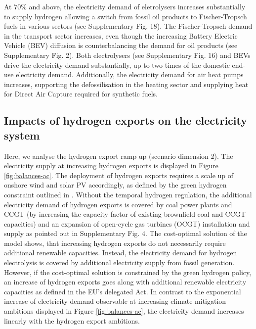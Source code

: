 \documentclass[5p,numafflabel]{elsarticle}
\begin{document}
At 70\% and above, the electricity demand of eletrolysers increases substantially to supply hydrogen allowing a switch from fossil oil products to Fischer-Tropsch fuels in various sectors (see Supplementary Fig. 18). %
The Fischer-Tropsch demand in the transport sector increases, even though the increasing Battery Electric Vehicle (BEV) diffusion is counterbalancing the demand for oil products (see Supplementary Fig. 2). %
Both electrolysers (see Supplementary Fig. 16) and BEVs drive the electricity demand substantially, up to two times of the domestic end-use electricity demand. %
Additionally, the electricity demand for air heat pumps increases, supporting the defossilisation in the heating sector and supplying heat for Direct Air Capture required for synthetic fuels.


\subsection*{Impacts of hydrogen exports on the electricity system}
\label{subsec:increase_h2}

Here, we analyse the hydrogen export ramp up (scenario dimension 2). The electricity supply at increasing hydrogen exports is displayed in Figure \ref{fig:balances-ac}. The deployment of hydrogen exports requires a scale up of onshore wind and solar PV accordingly, as defined by the green hydrogen constraint outlined in .
Without the temporal hydrogen regulation, the additional electricity demand of hydrogen exports is covered by coal power plants and CCGT (by increasing the capacity factor of existing brownfield coal and CCGT capacities) and an expansion of open-cycle gas turbines (OCGT) installation and supply as pointed out in Supplementary Fig. 4. %
The cost-optimal solution of the model shows, that increasing hydrogen exports do not necessarily require additional renewable capacities. Instead, the electricity demand for hydrogen electrolysis is covered by additional electricity supply from fossil generation. However, if the cost-optimal solution is constrained by the green hydrogen policy, an increase of hydrogen exports goes along with additional renewable electricity capacities as defined in the EU's delegated Act.
In contrast to the exponential increase of electricity demand observable at increasing climate mitigation ambitions displayed in Figure \ref{fig:balances-ac}, the electricity demand increases linearly with the hydrogen export ambitions.
\end{document}

